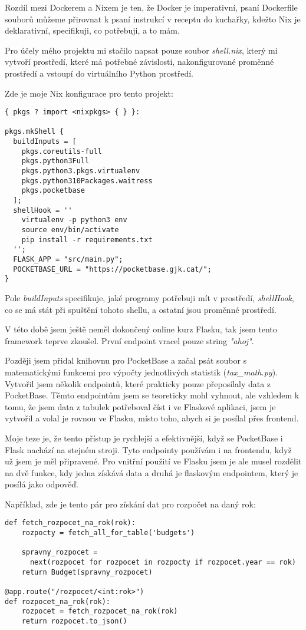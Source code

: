 \documentclass[11pt,a4paper,twoside,openright]{report}
\begin{document}
Rozdíl mezi Dockerem a Nixem je ten, že Docker je imperativní, psaní Dockerfile souborů můžeme přirovnat
k psaní instrukcí v receptu do kuchařky, kdežto Nix je deklarativní, specifikuji, co potřebuji, a to mám.

Pro účely mého projektu mi stačilo napsat pouze soubor \emph{shell.nix}, který mi vytvoří prostředí,
které má potřebné závislosti, nakonfigurované proměnné prostředí a vstoupí do virtuálního Python prostředí.

Zde je moje Nix konfigurace pro tento projekt:
\begin{verbatim}
{ pkgs ? import <nixpkgs> { } }:

pkgs.mkShell {
  buildInputs = [
    pkgs.coreutils-full
    pkgs.python3Full
    pkgs.python3.pkgs.virtualenv
    pkgs.python310Packages.waitress
    pkgs.pocketbase
  ];
  shellHook = ''
    virtualenv -p python3 env
    source env/bin/activate
    pip install -r requirements.txt
  '';
  FLASK_APP = "src/main.py";
  POCKETBASE_URL = "https://pocketbase.gjk.cat/";
}
\end{verbatim}

Pole \emph{buildInputs} specifikuje, jaké programy potřebuji mít v prostředí, \emph{shellHook}, co se má
stát při spuštění tohoto shellu, a ostatní jsou proměnné prostředí.


V této době jsem ještě neměl dokončený online kurz Flasku, tak jsem tento framework teprve zkoušel. První
endpoint vracel pouze string \emph{"ahoj"}.

Později jsem přidal knihovnu pro PocketBase a začal psát soubor s matematickými funkcemi pro výpočty
jednotlivých statistik (\emph{tax\_math.py}). Vytvořil jsem několik endpointů, které prakticky pouze
přeposílaly data z PocketBase. Těmto endpointům jsem se teoreticky mohl vyhnout, ale vzhledem k tomu,
že jsem data z tabulek potřeboval číst i ve Flaskové aplikaci, jsem je vytvořil a volal je rovnou ve
Flasku, místo toho, abych si je posílal přes frontend.

Moje teze je, že tento přístup je rychlejší a efektivnější, když se PocketBase i Flask nachází na stejném
stroji. Tyto endpointy používám i na frontendu, když už jsem je měl připravené. Pro vnitřní použití ve
Flasku jsem je ale musel rozdělit na dvě funkce, kdy jedna získává data a druhá je flaskovým endpointem,
který je posílá jako odpověď.

Například, zde je tento pár pro získání dat pro rozpočet na daný rok:

\begin{verbatim}
def fetch_rozpocet_na_rok(rok):
    rozpocty = fetch_all_for_table('budgets')

    spravny_rozpocet =
      next(rozpocet for rozpocet in rozpocty if rozpocet.year == rok)
    return Budget(spravny_rozpocet)

@app.route("/rozpocet/<int:rok>")
def rozpocet_na_rok(rok):
    rozpocet = fetch_rozpocet_na_rok(rok)
    return rozpocet.to_json()
\end{verbatim}
\end{document}
